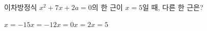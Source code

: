 이차방정식 $x^2+7x+2a=0$의 한 근이 $x=5$일 때, 다른 한 근은?
\begin{choices32}{$x=-15$}{$x=-12$}{$x=0$}{$x=2$}{$x=5$}\end{choices32}
